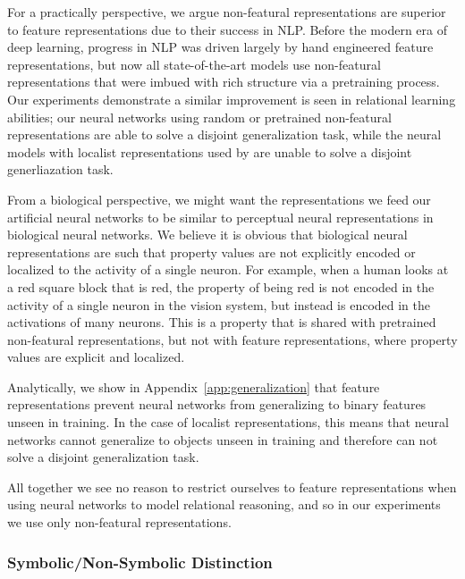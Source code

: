 \documentclass{article}
\newcommand{\appref}[1]{Appendix~\ref{#1}}
\begin{document}
{For a practically perspective, we argue non-featural representations are superior to feature representations due to their success in NLP. Before the modern era of deep learning, progress in NLP was driven largely by hand engineered feature representations, but now all state-of-the-art models use non-featural representations that were imbued with rich structure via a pretraining process. Our experiments demonstrate a similar improvement is seen in relational learning abilities; our neural networks using random or pretrained non-featural representations are able to solve a disjoint generalization task, while the neural models with localist representations used by \citep{marcus:1999} are unable to solve a disjoint generliazation task.

From a biological perspective, we might want the representations we feed our artificial neural networks to be similar to perceptual neural representations in biological neural networks. We believe it is obvious that biological neural representations are such that property values are not explicitly encoded or localized to the activity of a single neuron. For example, when a human looks at a red square block that is red, the property of being red is not encoded in the activity of a single neuron in the vision system, but instead is encoded in the activations of many neurons. This is a property that is shared with pretrained non-featural representations, but not with feature representations, where property values are explicit and localized.

Analytically, we show in \appref{app:generalization} that feature representations prevent neural networks from generalizing to binary features unseen in training. In the case of localist representations, this means that neural networks cannot generalize to objects unseen in training and therefore can not solve a disjoint generalization task. 

All together we see no reason to restrict ourselves to feature representations when using neural networks to model relational reasoning, and so in our experiments we use only non-featural representations.

\subsubsection{Symbolic/Non-Symbolic Distinction}


}
\end{document}

